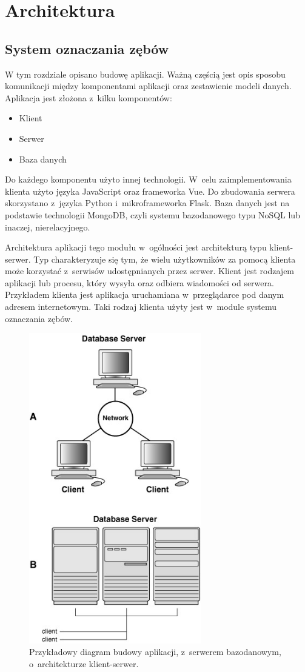 
\chapter{Architektura}


\section{System oznaczania zębów}
W tym rozdziale opisano budowę aplikacji. Ważną częścią jest opis sposobu komunikacji między komponentami aplikacji oraz zestawienie modeli danych. Aplikacja jest złożona z~kilku komponentów:
\begin{itemize}
\item Klient
\item Serwer
\item Baza danych
\end{itemize}
Do każdego komponentu użyto innej technologii. W~celu zaimplementowania klienta użyto języka JavaScript oraz frameworka Vue. Do zbudowania serwera skorzystano z~języka Python i~mikroframeworka Flask. Baza danych jest na podstawie technologii MongoDB, czyli systemu bazodanowego typu NoSQL lub inaczej, nierelacyjnego.

Architektura aplikacji tego modułu w~ogólności jest architekturą typu klient-serwer.\cite{clientServer} Typ charakteryzuje się tym, że wielu użytkowników za pomocą klienta może korzystać z~serwisów udostępnianych przez serwer. Klient jest rodzajem aplikacji lub procesu, który wysyła oraz odbiera wiadomości od serwera. Przykładem klienta jest aplikacja uruchamiana w~przeglądarce pod danym adresem internetowym. Taki rodzaj klienta użyty jest w~module systemu oznaczania zębów.

\begin{figure}[ht!]
\centering\includegraphics[width=75mm,scale=1.5]{figures/clientServerStanfor.jpg}
\caption{Przykładowy diagram budowy aplikacji, z~serwerem bazodanowym, o~architekturze klient-serwer.\cite{clientServerStanford}}
\label{fig:clientServerStanford}
\end{figure}

